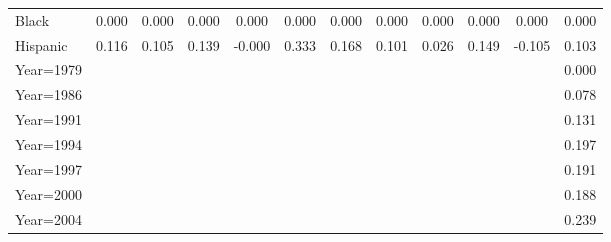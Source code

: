 \begin{table}[htbp]
\begin{tabular}{l*{11}{c}}
Black               &       0.000         &       0.000         &       0.000         &       0.000         &       0.000         &       0.000         &       0.000         &       0.000         &       0.000         &       0.000         &       0.000         \\
Hispanic            &       0.116         &       0.105         &       0.139         &      -0.000         &       0.333\sym{**} &       0.168         &       0.101         &       0.026         &       0.149         &      -0.105         &       0.103\sym{**} \\
Year=1979           &                     &                     &                     &                     &                     &                     &                     &                     &                     &                     &       0.000         \\
Year=1986           &                     &                     &                     &                     &                     &                     &                     &                     &                     &                     &       0.078\sym{*}  \\
Year=1991           &                     &                     &                     &                     &                     &                     &                     &                     &                     &                     &       0.131\sym{***}\\
Year=1994           &                     &                     &                     &                     &                     &                     &                     &                     &                     &                     &       0.197\sym{***}\\
Year=1997           &                     &                     &                     &                     &                     &                     &                     &                     &                     &                     &       0.191\sym{***}\\
Year=2000           &                     &                     &                     &                     &                     &                     &                     &                     &                     &                     &       0.188\sym{***}\\
Year=2004           &                     &                     &                     &                     &                     &                     &                     &                     &                     &                     &       0.239\sym{***}\\

\end{tabular}
\end{table}
